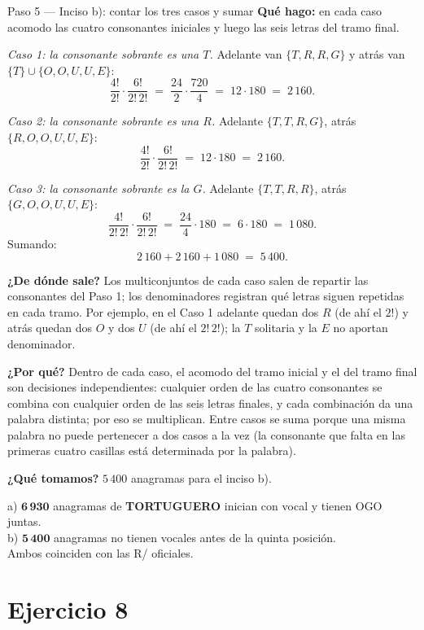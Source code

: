 \documentclass[11pt]{article}
\begin{document}
\begin{paso}{Paso 5 --- Inciso b): contar los tres casos y sumar}
\textbf{Qué hago:} en cada caso acomodo las cuatro consonantes iniciales y luego las seis letras del tramo
final.

\emph{Caso 1: la consonante sobrante es una $T$.} Adelante van $\{T,R,R,G\}$ y atrás van
$\{T\}\cup\{O,O,U,U,E\}$:
\[
\frac{4!}{2!}\cdot\frac{6!}{2!\,2!} \;=\; \frac{24}{2}\cdot\frac{720}{4} \;=\; 12\cdot 180 \;=\; 2\,160 .
\]

\emph{Caso 2: la consonante sobrante es una $R$.} Adelante $\{T,T,R,G\}$, atrás $\{R,O,O,U,U,E\}$:
\[
\frac{4!}{2!}\cdot\frac{6!}{2!\,2!} \;=\; 12\cdot 180 \;=\; 2\,160 .
\]

\emph{Caso 3: la consonante sobrante es la $G$.} Adelante $\{T,T,R,R\}$, atrás $\{G,O,O,U,U,E\}$:
\[
\frac{4!}{2!\,2!}\cdot\frac{6!}{2!\,2!} \;=\; \frac{24}{4}\cdot 180 \;=\; 6\cdot 180 \;=\; 1\,080 .
\]
Sumando:
\[
2\,160 + 2\,160 + 1\,080 \;=\; 5\,400 .
\]

\textbf{¿De dónde sale?} Los multiconjuntos de cada caso salen de repartir las consonantes del Paso 1; los
denominadores registran qué letras siguen repetidas en cada tramo. Por ejemplo, en el Caso 1 adelante quedan
dos $R$ (de ahí el $2!$) y atrás quedan dos $O$ y dos $U$ (de ahí el $2!\,2!$); la $T$ solitaria y la $E$ no
aportan denominador.

\textbf{¿Por qué?} Dentro de cada caso, el acomodo del tramo inicial y el del tramo final son decisiones
independientes: cualquier orden de las cuatro consonantes se combina con cualquier orden de las seis letras
finales, y cada combinación da una palabra distinta; por eso se multiplican. Entre casos se suma porque una
misma palabra no puede pertenecer a dos casos a la vez (la consonante que falta en las primeras cuatro
casillas está determinada por la palabra).

\textbf{¿Qué tomamos?} $5\,400$ anagramas para el inciso b).
\end{paso}

\begin{resp}
a) $\mathbf{6\,930}$ anagramas de \textbf{TORTUGUERO} inician con vocal y tienen OGO juntas.\\
b) $\mathbf{5\,400}$ anagramas no tienen vocales antes de la quinta posición.\\
Ambos coinciden con las R/ oficiales.
\end{resp}

\section*{Ejercicio 8}
\end{document}
